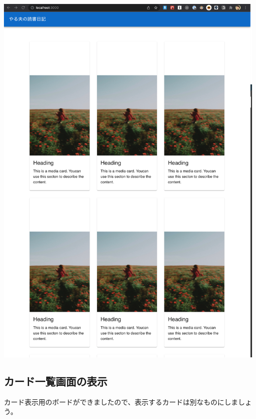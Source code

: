 \begin{reviewimage}%
\includegraphics[width=0.8\maxwidth]{./images/03-todo-with-react/mui008-album-done.png}%
\label{image:03-todo-with-react:mui008-album-done}
\end{reviewimage}

\clearpage


\subsection{カード一覧画面の表示}
\keeplastskip{
  \label{sec:3-3-4}
  \label{sec-0332}
  \par\nobreak
}

カード表示用のボードができましたので、表示するカードは別なものにしましょう。

\vspace*{\baselineskip}

